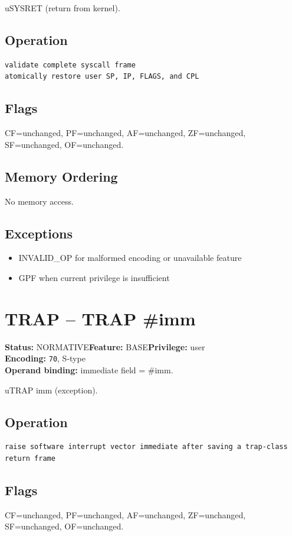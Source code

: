 \documentclass[10pt]{article}
\begin{document}
uSYSRET (return from kernel).

\subsection*{Operation}
\begin{lstlisting}
validate complete syscall frame
atomically restore user SP, IP, FLAGS, and CPL
\end{lstlisting}
\subsection*{Flags}
CF=unchanged, PF=unchanged, AF=unchanged, ZF=unchanged, SF=unchanged, OF=unchanged.
\subsection*{Memory Ordering}
No memory access.
\subsection*{Exceptions}
\begin{itemize}
\item INVALID\_OP for malformed encoding or unavailable feature
\item GPF when current privilege is insufficient
\end{itemize}
\clearpage

\section{TRAP -- TRAP \#imm}
\textbf{Status:} NORMATIVE\quad \textbf{Feature:} BASE\quad \textbf{Privilege:} user\\
\textbf{Encoding:} \texttt{70}, S-type\\
\textbf{Operand binding:} immediate field = \#imm.

uTRAP imm (exception).

\subsection*{Operation}
\begin{lstlisting}
raise software interrupt vector immediate after saving a trap-class return frame
\end{lstlisting}
\subsection*{Flags}
CF=unchanged, PF=unchanged, AF=unchanged, ZF=unchanged, SF=unchanged, OF=unchanged.
\end{document}
